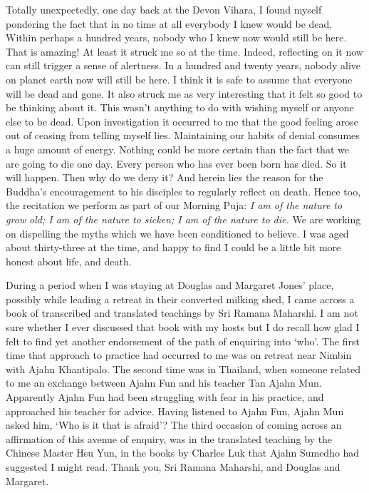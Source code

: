 Totally unexpectedly, one day back at the Devon Vihara, I found myself
pondering the fact that in no time at all everybody I knew would be
dead. Within perhaps a hundred years, nobody who I knew now would still
be here. That is amazing! At least it struck me so at the time. Indeed,
reflecting on it now can still trigger a sense of alertness. In a
hundred and twenty years, nobody alive on planet earth now
will still be here.
I think it is safe to assume that everyone will be dead and gone.
It also struck me as very interesting that it felt so good to be
thinking about it. This wasn't anything to do with wishing myself or
anyone else to be dead. Upon investigation it occurred to me that the
good feeling arose out of ceasing from telling myself lies. Maintaining
our habits of denial consumes a huge amount of energy. Nothing could be
more certain than the fact that we are going to die one day. Every
person who has ever been born has died. So it will happen. Then why do
we deny it? And herein lies the reason for the Buddha's encouragement to
his disciples to regularly reflect on death\cite{death}.
Hence too, the recitation we perform as
part of our Morning Puja: \emph{I am of the nature to grow old; I am of
the nature to sicken; I am of the nature to die.} We are working on
dispelling the myths which we have been conditioned to believe. I was
aged about thirty-three at the time, and happy to find I could be a
little bit more honest about life, and death.

During a period when I was staying at Douglas and Margaret Jones' place,
possibly while leading a retreat in their converted milking shed, I came
across a book of transcribed and translated teachings by Sri Ramana Maharshi\cite{maharshi}.
I am not sure whether I ever discussed that
book with my hosts but I do recall how glad I felt to find yet another
endorsement of the path of enquiring into `who'. The first time that
approach to practice had occurred to me was on retreat near Nimbin with
Ajahn Khantipalo. The second time was in Thailand, when someone related
to me an exchange between Ajahn Fun and his teacher Tan Ajahn Mun.
Apparently Ajahn Fun had been struggling with fear in his practice, and
approached his teacher for advice. Having listened to Ajahn Fun, Ajahn
Mun asked him, `Who is it that is afraid'? The third occasion of coming
across an affirmation of this avenue of enquiry, was in the translated
teaching by the Chinese Master Hsu Yun, in the books by Charles Luk that
Ajahn Sumedho had suggested I might read. Thank you, Sri Ramana
Maharshi, and Douglas and Margaret.

